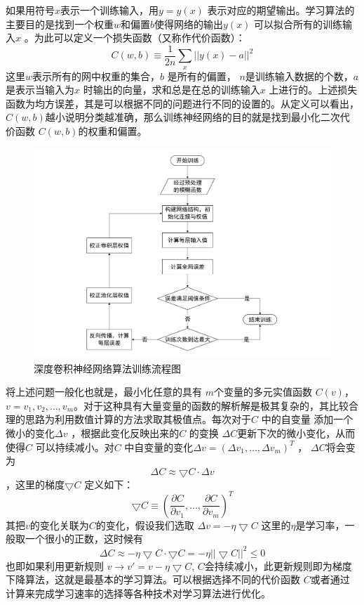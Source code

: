 如果用符号$x $表示一个训练输入，用$y=y(x) $ 表示对应的期望输出。学习算法的主要目的是找到一个权重$w$和偏置$b$使得网络的输出$y(x) $ 可以拟合所有的训练输入$x$ 。为此可以定义一个损失函数（又称作代价函数）：
\begin{equation}
  C(w,b)\equiv \frac{1}{2n}\sum_x||y(x)-a||^2 
\end{equation}
这里$w$表示所有的网中权重的集合，$b$ 是所有的偏置， $n$是训练输入数据的个数，$a$ 是表示当输入为$x$ 时输出的向量，求和总是在总的训练输入$x$ 上进行的。上述损失函数为均方误差，其是可以根据不同的问题进行不同的设置的。从定义可以看出， $C(w,b) $越小说明分类越准确，那么训练神经网络的目的就是找到最小化二次代价函数 $C(w,b) $的权重和偏置。
\begin{figure}
	\centering
	\includegraphics[width=\textwidth]{figures/cnn_flow.pdf}
	\caption{深度卷积神经网络算法训练流程图}
\end{figure}
将上述问题一般化也就是，最小化任意的具有 $m $个变量的多元实值函数 $C(v) $， $v=v_1,v_2,\dots,v_m $。对于这种具有大量变量的函数的解析解是极其复杂的，其比较合理的思路为利用数值计算的方法求取其极值点。每次对于$C $ 中的自变量 添加一个微小的变化$\Delta v $ ，根据此变化反映出来的$C $ 的变换 $\Delta C $更新下次的微小变化，从而使得$C $ 可以持续减小。对$C $ 中自变量的变化$\Delta v=(\Delta v_1,\dots,\Delta v_m)^T $ ， $\Delta C $将会变为
\begin{equation}
    \Delta C \approx \bigtriangledown C \cdot \Delta v   
\end{equation}
，这里的梯度$\bigtriangledown C $ 定义如下：
\begin{equation}
\bigtriangledown C \equiv (\frac{\partial C}{\partial v_1},\dots,\frac{\partial C}{\partial v_m})^T 
\end{equation}
其把$v$的变化关联为$C$的变化，假设我们选取
$\Delta v=-\eta \bigtriangledown C $
这里的$\eta $是学习率，一般取一个很小的正数，这时候有
\begin{equation}
\Delta C \approx -\eta\bigtriangledown C\cdot\bigtriangledown C=-\eta||\bigtriangledown C||^2 \leq 0  
\end{equation}
也即如果利用更新规则
$v \rightarrow v'=v-\eta \bigtriangledown C$,
$C $会持续减小，此更新规则即为梯度下降算法，这就是最基本的学习算法。可以根据选择不同的代价函数 $C $或者通过计算来完成学习速率的选择等各种技术对学习算法进行优化。

